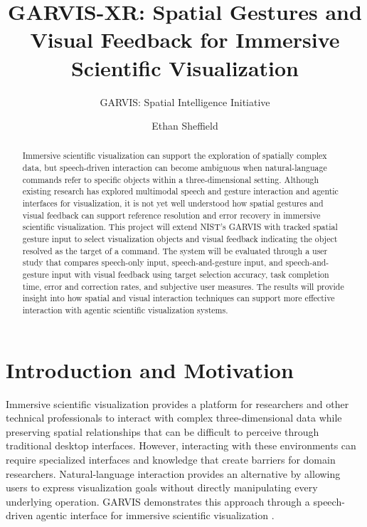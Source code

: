 \documentclass[sigconf,nonacm]{acmart}
\begin{document}
\title{GARVIS-XR: Spatial Gestures and Visual Feedback for Immersive Scientific Visualization}
\subtitle{GARVIS: Spatial Intelligence Initiative}

\author{Ethan Sheffield}

\renewcommand{\shortauthors}{GARVIS: Spatial Intelligence Initiative}

\begin{abstract}
Immersive scientific visualization can support the exploration of spatially complex data, but speech-driven interaction can become ambiguous when natural-language commands refer to specific objects within a three-dimensional setting. Although existing research has explored multimodal speech and gesture interaction and agentic interfaces for visualization, it is not yet well understood how spatial gestures and visual feedback can support reference resolution and error recovery in immersive scientific visualization. This project will extend NIST’s GARVIS with tracked spatial gesture input to select visualization objects and visual feedback indicating the object resolved as the target of a command. The system will be evaluated through a user study that compares speech-only input, speech-and-gesture input, and speech-and-gesture input with visual feedback using target selection accuracy, task completion time, error and correction rates, and subjective user measures. The results will provide insight into how spatial and visual interaction techniques can support more effective interaction with agentic scientific visualization systems. 
\end{abstract}


\maketitle

\section{Introduction and Motivation}

Immersive scientific visualization provides a platform for researchers and other technical professionals to interact with complex three-dimensional data while preserving spatial relationships that can be difficult to perceive through traditional desktop interfaces. However, interacting with these environments can require specialized interfaces and knowledge that create barriers for domain researchers. Natural-language interaction provides an alternative by allowing users to express visualization goals without directly manipulating every underlying operation. GARVIS demonstrates this approach through a speech-driven agentic interface for immersive scientific visualization \cite{su2025garvis}.
\end{document}
